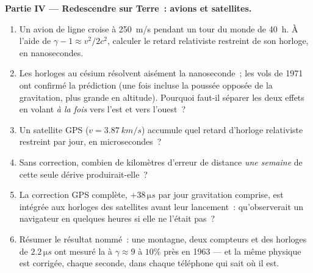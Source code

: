 \begin{problem}
\medskip\noindent\textbf{Partie IV --- Redescendre sur Terre~: avions
et satellites.}
\begin{enumerate}[resume]
  \item Un avion de ligne croise à \qty{250}{m/s} pendant un tour du
        monde de \qty{40}{h}. À l'aide de $\gamma - 1 \approx v^2/2c^2$,
        calculer le retard relativiste restreint de son horloge, en
        nanosecondes.
  \item Les horloges au césium résolvent aisément la nanoseconde~; les
        vols de 1971 ont confirmé la prédiction (une fois incluse la
        poussée opposée de la gravitation, plus grande en altitude).
        Pourquoi faut-il séparer les deux effets en volant \emph{à la
        fois} vers l'est et vers l'ouest~?
  \item Un satellite GPS ($v = \qty{3.87}{km/s}$) accumule quel retard
        d'horloge relativiste restreint par jour, en microsecondes~?
  \item Sans correction, combien de kilomètres d'erreur de distance
        \emph{une semaine} de cette seule dérive produirait-elle~?
  \item La correction GPS complète, $+38\,\unit{\micro s}$ par jour
        gravitation comprise, est intégrée aux horloges des satellites
        avant leur lancement~: qu'observerait un navigateur en
        quelques heures si elle ne l'était pas~?
  \item Résumer le résultat nommé~: une montagne, deux compteurs et
        des horloges de $2.2\,\unit{\micro s}$ ont mesuré la
         à $\gamma \approx 9$ à $10\%$ près en 1963
        --- et la même physique est corrigée, chaque seconde, dans
        chaque téléphone qui sait où il est.
\end{enumerate}
\end{problem}
